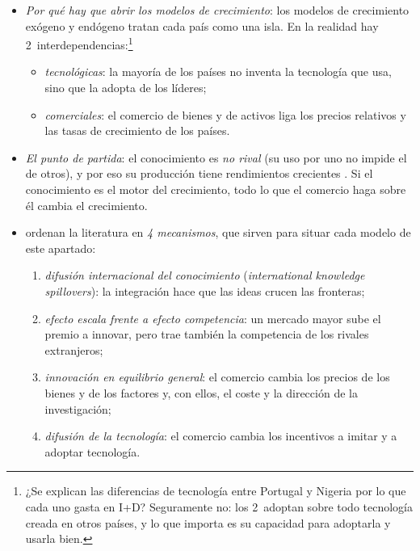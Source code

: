 \documentclass[11pt]{article}
\begin{document}
\begin{itemize}
\item \emph{Por qué hay que abrir los modelos de crecimiento}: los modelos de crecimiento exógeno  y endógeno  tratan cada país como una isla. En la realidad hay 2~interdependencias\nocite{Acemoglu2009}:\footnote{¿Se explican las diferencias de tecnología entre Portugal y Nigeria por lo que cada uno gasta en I+D? Seguramente no: los 2~adoptan sobre todo tecnología creada en otros países, y lo que importa es su capacidad para adoptarla y usarla bien\nocite{Acemoglu2009}.}
  \begin{itemize}
  \item \emph{tecnológicas}: la mayoría de los países no inventa la tecnología que usa, sino que la adopta de los líderes;
  \item \emph{comerciales}: el comercio de bienes y de activos liga los precios relativos y las tasas de crecimiento de los países.
  \end{itemize}
\item \emph{El punto de partida}: el conocimiento es \emph{no rival} (su uso por uno no impide el de otros), y por eso su producción tiene rendimientos crecientes . Si el conocimiento es el motor del crecimiento, todo lo que el comercio haga sobre él cambia el crecimiento.
\item \textcite{GrossmanHelpman2015Globalization} ordenan la literatura en \emph{4 mecanismos}, que sirven para situar cada modelo de este apartado:
  \begin{enumerate}
  \item \emph{difusión internacional del conocimiento} (\emph{international knowledge spillovers}): la integración hace que las ideas crucen las fronteras;
  \item \emph{efecto escala frente a efecto competencia}: un mercado mayor sube el premio a innovar, pero trae también la competencia de los rivales extranjeros;
  \item \emph{innovación en equilibrio general}: el comercio cambia los precios de los bienes y de los factores y, con ellos, el coste y la dirección de la investigación;
  \item \emph{difusión de la tecnología}: el comercio cambia los incentivos a imitar y a adoptar tecnología.
  \end{enumerate}
\end{itemize}

\end{document}
